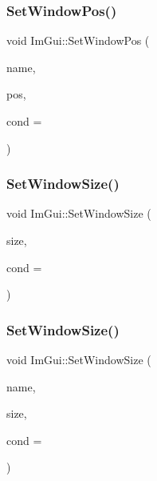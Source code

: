\hypertarget{namespace_im_gui_a32032b56f975bb3145adbe19f38f3b56}{}\label{namespace_im_gui_a32032b56f975bb3145adbe19f38f3b56} 
\subsubsection{\texorpdfstring{Set\+Window\+Pos()}{SetWindowPos()}\hspace{0.1cm}{\footnotesize\ttfamily [2/2]}}
{\footnotesize\ttfamily void Im\+Gui\+::\+Set\+Window\+Pos (\begin{DoxyParamCaption}\item[{const char $\ast$}]{name,  }\item[{const \hyperlink{struct_im_vec2}{Im\+Vec2} \&}]{pos,  }\item[{Im\+Gui\+Cond}]{cond = {} }\end{DoxyParamCaption})}

\hypertarget{namespace_im_gui_a657c6cc2246485332f608a5204447ea1}{}\label{namespace_im_gui_a657c6cc2246485332f608a5204447ea1} 
\subsubsection{\texorpdfstring{Set\+Window\+Size()}{SetWindowSize()}\hspace{0.1cm}{\footnotesize\ttfamily [1/2]}}
{\footnotesize\ttfamily void Im\+Gui\+::\+Set\+Window\+Size (\begin{DoxyParamCaption}\item[{const \hyperlink{struct_im_vec2}{Im\+Vec2} \&}]{size,  }\item[{Im\+Gui\+Cond}]{cond = {} }\end{DoxyParamCaption})}

\hypertarget{namespace_im_gui_a441528b9198d4531e79337121212cd33}{}\label{namespace_im_gui_a441528b9198d4531e79337121212cd33} 
\subsubsection{\texorpdfstring{Set\+Window\+Size()}{SetWindowSize()}\hspace{0.1cm}{\footnotesize\ttfamily [2/2]}}
{\footnotesize\ttfamily void Im\+Gui\+::\+Set\+Window\+Size (\begin{DoxyParamCaption}\item[{const char $\ast$}]{name,  }\item[{const \hyperlink{struct_im_vec2}{Im\+Vec2} \&}]{size,  }\item[{Im\+Gui\+Cond}]{cond = {} }\end{DoxyParamCaption})}

